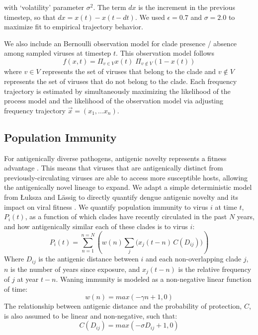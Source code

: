with `volatility' parameter $\sigma^2$.
The term $dx$ is the increment in the previous timestep, so that $dx = x(t) - x(t-dt)$.
We used $\epsilon = 0.7$ and $\sigma = 2.0$ to maximize fit to empirical trajectory behavior.

We also include an Bernoulli observation model for clade presence / absence among sampled viruses at timestep $t$.
This observation model follows
\begin{equation}
f(x,t) = \Pi_{v \in V} x(t) \; \Pi_{v \notin V} (1-x(t))
\end{equation}
where $v \in V$ represents the set of viruses that belong to the clade and $v \notin V$ represents the set of viruses that do not belong to the clade.
Each frequency trajectory is estimated by simultaneously maximizing the likelihood of the process model and the likelihood of the observation model via adjusting frequency trajectory $\vec{x} = (x_1, ... x_n)$.

\subsection*{Population Immunity}
For antigenically diverse pathogens, antigenic novelty represents a fitness advantage \citep{lipsitch2007patterns}.
This means that viruses that are antigenically distinct from previously-circulating viruses are able to access more susceptible hosts, allowing the antigenically novel lineage to expand.
We adapt a simple deterministic model from {\L}uksza and L\"assig to directly quantify dengue antigenic novelty and its impact on viral fitness \citep{luksza2014predictive}.
We quantify population immunity to virus $i$ at time $t$, $P_i(t)$, as a function of which clades have recently circulated in the past $N$ years, and how antigenically similar each of these clades is to virus $i$:
\begin{equation}
  \label{eq_population_immunity}
P_i(t) = \sum_{n=1}^{n=N} \left(w(n)  \sum_{j} \Big( x_j(t-n) \, C( D_{ij}) \Big) \right)
\end{equation}
Where $D_{ij}$ is the antigenic distance between $i$ and each non-overlapping clade $j$, $n$ is the number of years since exposure, and $x_j(t-n)$ is the relative frequency of $j$ at year $t-n$.
Waning immunity is modeled as a non-negative linear function of time:
\begin{equation}
\label{eq_waning_immunity}
  w(n) = max(-\gamma n + 1, 0)
\end{equation}
The relationship between antigenic distance and the probability of protection, $C$, is also assumed to be linear and non-negative, such that:
\begin{equation}
C(D_{ij}) = max(-\sigma D_{ij} + 1, 0)
\end{equation}

